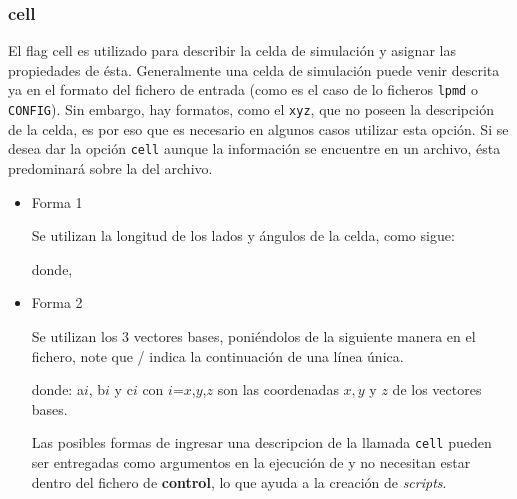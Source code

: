 \subsubsection{cell}

El flag cell es utilizado para describir la celda de simulaci\'on y asignar las
propiedades de \'esta. Generalmente una celda de simulaci\'on puede venir
descrita ya en el formato del fichero de entrada (como es el caso de lo ficheros
\texttt{lpmd} o \texttt{CONFIG}). Sin embargo, hay formatos, como el
\texttt{xyz}, que no poseen la descripci\'on de la celda, es por eso que es
necesario en algunos casos utilizar esta opci\'on. Si se desea dar la opci\'on
\verb|cell| aunque la informaci\'on se encuentre en un archivo, \'esta
predominar\'a sobre la del archivo.

\begin{itemize} 
\item{Forma 1}

Se utilizan la longitud de los lados y \'angulos de la celda, como sigue:


donde,


\item{Forma 2}

Se utilizan los 3 vectores bases, poni\'endolos de la siguiente manera en el
fichero, note que / indica la continuaci\'on de una l\'inea \'unica.


donde: a${i}$, b${i}$ y c${i}$ con $i$={$x$,$y$,$z$} son las coordenadas $x, y$
y $z$ de los vectores bases.

Las posibles formas de ingresar una descripcion de la llamada \verb|cell| pueden
ser entregadas como argumentos en la ejecuci\'on de {\lpmd} y no necesitan estar
dentro del fichero de \textbf{control}, lo que ayuda a la creaci\'on de
\textit{scripts}.


\end{itemize}
